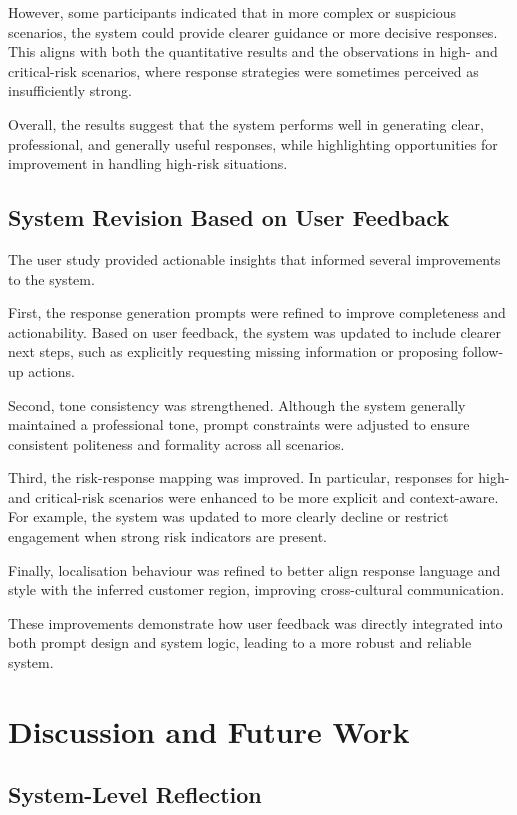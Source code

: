 \documentclass[12pt,a4paper]{report}
\begin{document}
However, some participants indicated that in more complex or suspicious scenarios, the system could provide clearer guidance or more decisive responses. This aligns with both the quantitative results and the observations in high- and critical-risk scenarios, where response strategies were sometimes perceived as insufficiently strong.

Overall, the results suggest that the system performs well in generating clear, professional, and generally useful responses, while highlighting opportunities for improvement in handling high-risk situations.

\section{System Revision Based on User Feedback}

The user study provided actionable insights that informed several improvements to the system.

First, the response generation prompts were refined to improve completeness and actionability. Based on user feedback, the system was updated to include clearer next steps, such as explicitly requesting missing information or proposing follow-up actions.

Second, tone consistency was strengthened. Although the system generally maintained a professional tone, prompt constraints were adjusted to ensure consistent politeness and formality across all scenarios.

Third, the risk-response mapping was improved. In particular, responses for high- and critical-risk scenarios were enhanced to be more explicit and context-aware. For example, the system was updated to more clearly decline or restrict engagement when strong risk indicators are present.

Finally, localisation behaviour was refined to better align response language and style with the inferred customer region, improving cross-cultural communication.

These improvements demonstrate how user feedback was directly integrated into both prompt design and system logic, leading to a more robust and reliable system.

\chapter{Discussion and Future Work}

\section{System-Level Reflection}
\end{document}
